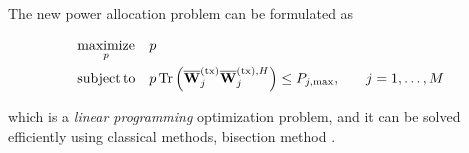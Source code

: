 The new power allocation problem can be formulated as

\begin{equation} \label{eq:equal_optim}
\begin{aligned}
    &\operatorname*{maximize}\limits_{p} && p \\
    &\operatorname*{subject\,to} && p \operatorname*{Tr} \left(\mathbf{\overline{W}}^{(\text{tx})}_j \mathbf{\overline{W}}^{(\text{tx}),H}_j \right) \leq P_{j, \max}, &\quad
    j = 1, \ldots, M
\end{aligned}
\end{equation}

\noindent
which is a \emph{linear programming} optimization problem, and it can be solved
efficiently using classical methods, \eg bisection method
\cite{burden_numerical}.
